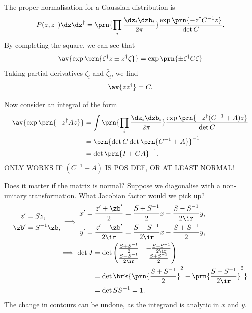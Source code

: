 \documentclass[12pt]{article}
\newcommand{\inv}{^{-1}}
\newcommand{\dg}{^\dagger}
\begin{document}
The proper normalisation for a Gaussian distribution is
%
\begin{equation}\label{eq:compgaussnorm}
  P(z,z\dg)\dz\dz\dg = \prn{\prod_i\frac{\dz_i\dzb_i}{2\pi}} \frac{\exp\prn{-z\dg C\inv z}}{\det C}.
\end{equation}
%
By completing the square, we can see that
%
\begin{equation}\label{eq:compgausslin}
  \av{\exp\prn{\zeta\dg z \pm z\dg\zeta}} = \exp\prn{\pm\zeta\dg C\zeta}
\end{equation}
%
Taking partial derivatives \wrt $\zeta_i$ and $\bar{\zeta}_i$, we find
%
\begin{equation}\label{eq:compgauscov}
  \av{zz\dg} = C.
\end{equation}
%

Now consider an integral of the form
%
\begin{equation}\label{eq:compgaussquad}
\begin{aligned}
  \av{\exp\prn{-z\dg A z}} &=
    \int \prn{\prod_i\frac{\dz_i\dzb_i}{2\pi}}\frac{\exp\prn{-z\dg (C\inv+A) z}}{\det C} \\
    &= \prn{\det C\det\prn{C\inv+A}}\inv \\
    &= \det\prn{I+CA}\inv.
\end{aligned}
\end{equation}
%
ONLY WORKS IF $(C\inv+A)$ IS POS DEF, OR AT LEAST NORMAL!

Does it matter if the matrix is normal?
Suppose we diagonalise with a non-unitary transformation.
What Jacobian factor would we pick up?
%
\begin{equation*}
\begin{aligned}
  \begin{aligned}
    z'   &= Sz, \\
    \zb' &=S\inv\zb,
  \end{aligned}
  &\implies
  \begin{aligned}
    x' &= \frac{z'+\zb'}{2}    = \frac{S+S\inv}{2}x - \frac{S-S\inv}{2\ir}y, \\
    y' &= \frac{z'-\zb'}{2\ir} = \frac{S-S\inv}{2\ir}x - \frac{S+S\inv}{2}y,
  \end{aligned}
  \\ &
  \begin{aligned}
  \implies  \det J &= \det\begin{pmatrix}
                    \frac{S+S\inv}{2}    & -\frac{S-S\inv}{2\ir} \\
                    \frac{S-S\inv}{2\ir} & \frac{S+S\inv}{2} \\
                  \end{pmatrix}
     \\
     &= \det \brk{\prn{\frac{S+S\inv}{2}}^2-\prn{\frac{S-S\inv}{2\ir}}^2}\\
     &=\det S S\inv = 1.
  \end{aligned}
\end{aligned}
\end{equation*}
%
The change in contours can be undone, as the integrand is analytic in $x$ and $y$.
\end{document}
